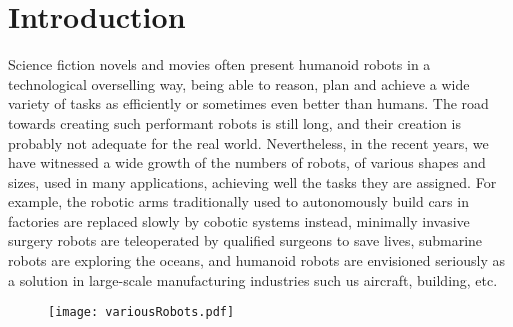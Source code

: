 


\chapter*{Introduction}
\label{cha:introduction}

\graphicspath{{Chapter0-Introduction/Figs/Vector/}{Chapter0-Introduction/Figs/}}

Science fiction novels and movies often present humanoid robots in a technological overselling way, being able to reason, plan and achieve a wide variety of tasks as efficiently or sometimes even better than humans.
The road towards creating such performant robots is still long, and their creation is probably not adequate for the real world.
Nevertheless, in the recent years, we have witnessed a wide growth of the numbers of robots, of various shapes and sizes, used in many applications, achieving well the tasks they are assigned.
For example, the robotic arms traditionally used to autonomously build cars in factories are replaced slowly by cobotic systems instead, minimally invasive surgery robots are teleoperated by qualified surgeons to save lives, submarine robots are exploring the oceans, and humanoid robots are envisioned seriously as a solution in large-scale manufacturing industries such us aircraft, building, etc.

\begin{figure}[ht]
  \centering
  \texttt{[image: variousRobots.pdf]}
\label{fig:various}
\end{figure}

